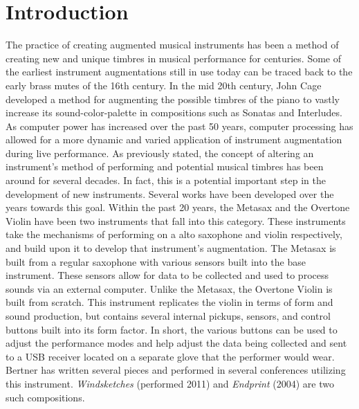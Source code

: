 \chapter{Introduction}
\label{chap:intro}
The practice of creating augmented musical instruments has been a method of creating new and unique timbres in musical performance for centuries. Some of the earliest instrument augmentations still in use today can be traced back to the early brass mutes of the 16th century. In the mid 20th century, John Cage developed a method for augmenting the possible timbres of the piano to vastly increase its sound-color-palette in compositions such as Sonatas and Interludes. 
As computer power has increased over the past 50 years,
computer processing has allowed for a more dynamic and varied application of instrument augmentation during live performance. As previously stated, the concept of altering an instrument’s method of performing and potential musical timbres has been around for several decades. In fact, this is a potential important step in the development of new instruments. 
Several works have been developed over the years towards this goal. Within the past 20 years, the Metasax and the Overtone Violin have been two instruments that fall into this category. These instruments take the mechanisms of performing on a alto saxophone and violin respectively, and build upon it to develop that instrument’s augmentation. The Metasax is built from a regular saxophone with various sensors built into the base instrument. These sensors allow for data to be collected and used to process sounds via an external computer. 
Unlike the Metasax, the Overtone Violin is built from scratch. This instrument replicates the violin in terms of form and sound production, but contains several internal pickups, sensors, and control buttons built into its form factor. In short, the various buttons can be used to adjust the performance modes and help adjust the data being collected and sent to a USB receiver located on a separate glove that the performer would wear. Bertner has written several pieces and performed in several conferences utilizing this instrument. \textit{Windsketches} (performed 2011) and \textit{Endprint} (2004) are two such compositions.


